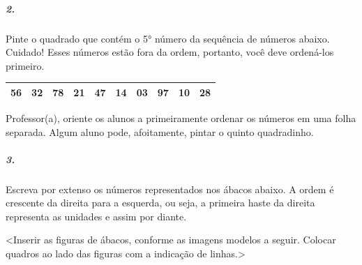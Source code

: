 \subparagraph{2. }\label{section-1}

Pinte o quadrado que contém o 5° número da sequência de números abaixo.
Cuidado! Esses números estão fora da ordem, portanto, você deve
ordená-los primeiro.

\begin{longtable}[]{@{}llllllllll@{}}
\toprule
56 & 32 & 78 & 21 & 47 & 14 & 03 & 97 & 10 & 28\tabularnewline
\bottomrule
\end{longtable}

Professor(a), oriente os alunos a primeiramente ordenar os números em
uma folha separada. Algum aluno pode, afoitamente, pintar o quinto
quadradinho.

\subparagraph{3. }\label{section-2}

Escreva por extenso os números representados nos ábacos abaixo. A ordem
é crescente da direita para a esquerda, ou seja, a primeira haste da
direita representa as unidades e assim por diante.

\textless{}Inserir as figuras de ábacos, conforme as imagens modelos a
seguir. Colocar quadros ao lado das figuras com a indicação de
linhas.\textgreater{}

